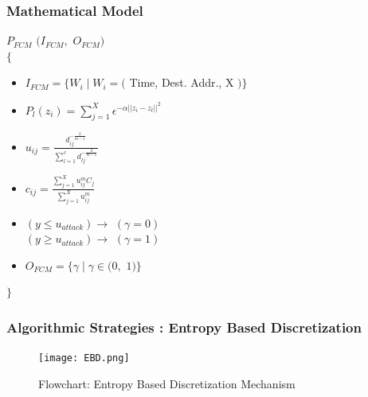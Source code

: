 \documentclass[10pt]{beamer}
\begin{document}
\begin{frame}
\frametitle{Mathematical Model}
\footnotesize
$P_{FCM} $ $ (I_{FCM},$ $O_{FCM})$\\
$\lbrace$
\indent
\begin{itemize}
\footnotesize
\item $I_{FCM} = \lbrace W_{i} \mid W_{i} = ($ Time, Dest. Addr., X $) \rbrace$

\item $P_{l}(z_{i}) = \sum_{j=1}^{X}  \epsilon ^ { - \alpha || z_{i} - z_{l} || ^{2}} $ 

\item $ u_{ij} = \frac{d_{ij}^{-\frac{2}{m-1}}}{\sum_{l=1}^{c} d_{lj}^{- \frac{2}{m-1}}} $

\item $ c_{ij} = \frac{\sum_{j=1}^{X} u_{ij}^{m}C_{j}}{\sum_{j=1}^{X} u_{ij}^{m}} $

\item $(y \leq u_{attack}) \rightarrow  $ $ (\gamma = 0)$ \\ $(y \geq u_{attack}) \rightarrow  $ $ (\gamma = 1)$

\item $ O_{FCM} = \lbrace \gamma \mid \gamma \in (0, $ $1) \rbrace$
\end{itemize}
$ \rbrace$

\end{frame}

\begin{frame}
\frametitle{Algorithmic Strategies : Entropy Based Discretization}
\begin{figure}
\texttt{[image: EBD.png]}
\caption{\footnotesize Flowchart: Entropy Based Discretization Mechanism}
\end{figure}
\end{frame}
\end{document}
